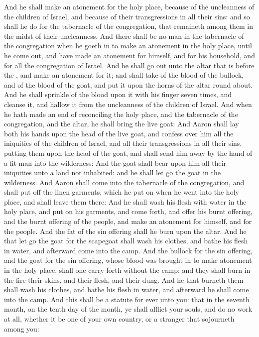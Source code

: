 \begin{biblechapter}
\verse And he shall make an atonement for the holy place, because of the uncleanness of the children of Israel, and because of their transgressions in all their sins: and so shall he do for the tabernacle of the congregation, that remaineth among them in the midst of their uncleanness.
\verse And there shall be no man in the tabernacle of the congregation when he goeth in to make an atonement in the holy place, until he come out, and have made an atonement for himself, and for his household, and for all the congregation of Israel.
\verse And he shall go out unto the altar that is before the \LORD, and make an atonement for it; and shall take of the blood of the bullock, and of the blood of the goat, and put it upon the horns of the altar round about.
\verse And he shall sprinkle of the blood upon it with his finger seven times, and cleanse it, and hallow it from the uncleanness of the children of Israel.
\verse And when he hath made an end of reconciling the holy place, and the tabernacle of the congregation, and the altar, he shall bring the live goat:
\verse And Aaron shall lay both his hands upon the head of the live goat, and confess over him all the iniquities of the children of Israel, and all their transgressions in all their sins, putting them upon the head of the goat, and shall send him away by the hand of a fit man into the wilderness:
\verse And the goat shall bear upon him all their iniquities unto a land not inhabited: and he shall let go the goat in the wilderness.
\verse And Aaron shall come into the tabernacle of the congregation, and shall put off the linen garments, which he put on when he went into the holy place, and shall leave them there:
\verse And he shall wash his flesh with water in the holy place, and put on his garments, and come forth, and offer his burnt offering, and the burnt offering of the people, and make an atonement for himself, and for the people.
\verse And the fat of the sin offering shall he burn upon the altar.
\verse And he that let go the goat for the scapegoat shall wash his clothes, and bathe his flesh in water, and afterward come into the camp.
\verse And the bullock for the sin offering, and the goat for the sin offering, whose blood was brought in to make atonement in the holy place, shall one carry forth without the camp; and they shall burn in the fire their skins, and their flesh, and their dung.
\verse And he that burneth them shall wash his clothes, and bathe his flesh in water, and afterward he shall come into the camp.
\verse And this shall be a statute for ever unto you: that in the seventh month, on the tenth day of the month, ye shall afflict your souls, and do no work at all, whether it be one of your own country, or a stranger that sojourneth among you:

\end{biblechapter}
